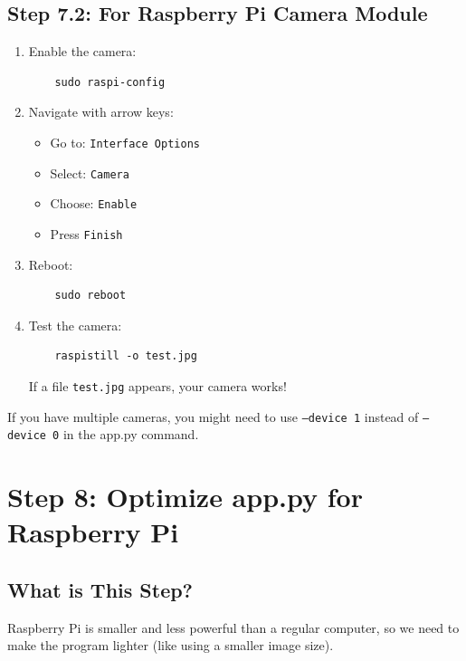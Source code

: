 \documentclass[12pt,a4paper]{article}
\begin{document}
\subsection{Step 7.2: For Raspberry Pi Camera Module}

\begin{enumerate}
    \item Enable the camera:
    \begin{lstlisting}
    sudo raspi-config
    \end{lstlisting}
    
    \item Navigate with arrow keys:
    \begin{itemize}
        \item Go to: \texttt{Interface Options}
        \item Select: \texttt{Camera}
        \item Choose: \texttt{Enable}
        \item Press \texttt{Finish}
    \end{itemize}
    
    \item Reboot:
    \begin{lstlisting}
    sudo reboot
    \end{lstlisting}
    
    \item Test the camera:
    \begin{lstlisting}
    raspistill -o test.jpg
    \end{lstlisting}
    
    If a file \texttt{test.jpg} appears, your camera works!
\end{enumerate}

\begin{tipbox}
If you have multiple cameras, you might need to use \texttt{--device 1} instead of \texttt{--device 0} in the app.py command.
\end{tipbox}

\section{Step 8: Optimize app.py for Raspberry Pi}

\subsection{What is This Step?}

Raspberry Pi is smaller and less powerful than a regular computer, so we need to make the program lighter (like using a smaller image size).
\end{document}
